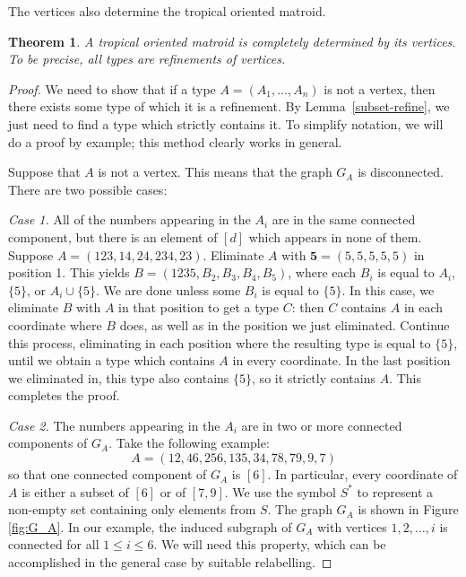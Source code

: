 \documentclass[11pt]{amsart}
\newtheorem{thm}{Theorem}[section]
\begin{document}
The vertices also determine the tropical oriented matroid.



\begin{thm}\label{thm:vertices}
A tropical oriented matroid is completely determined by its vertices. To be precise, all types are refinements of vertices.
\end{thm}

\begin{proof}
We need to show that if a type $A = (A_1, \ldots, A_n)$ is not a vertex, then there exists some type of which it is a 
refinement. By Lemma~\ref{subset-refine}, we just need to find a type which strictly contains it. To simplify notation, 
we will do a proof by example; this method clearly works in general.

Suppose that $A$ is not a vertex. This means that the graph $G_A$ is disconnected. There are two possible cases:

\textit{Case 1.} All of the numbers appearing in the $A_i$ are in the same connected component, but there is an element 
of $[d]$ which appears in none of them. Suppose $A = (123, 14, 24, 234, 23)$. Eliminate $A$ with $\textbf{5}=(5,5,5,5,5)$ in position 
1. This yields $B = (1235, B_2, B_3, B_4, B_5)$, where each $B_i$ is equal to $A_i$, $\{5\}$, or $A_i\cup \{5\}$. We are 
done unless some $B_i$ is equal to $\{5\}$. In this case, we eliminate $B$ with $A$ in that position to get a type $C$: 
then $C$ contains $A$ in each coordinate where $B$ does, as well as in the position we just eliminated. Continue 
this process, eliminating in each position where the resulting type is equal to $\{5\}$, until we obtain a type which 
contains $A$ in every coordinate. In the last position we eliminated in, this type also contains $\{5\}$, so 
it 
strictly contains $A$. This completes the proof.


\textit{Case 2.} The numbers appearing in the $A_i$ are in two or more connected components of $G_A$. Take the following 
example:
\[
A = (12,46,256,135,34,78,79,9,7)
\]
so that one connected component of $G_A$ is $[6]$. %
In particular, every coordinate of $A$ is either a subset of $[6]$ or of $[7, 9]$. 
We use the symbol $S^*$ to represent a non-empty set containing only elements from $S$.  The graph $G_A$ is shown in Figure \ref{fig:G_A}. In our example, the induced subgraph of $G_A$ with vertices $1,2,\ldots, i$ is connected for all $1 \leq i \leq 6$. We will need this property, which can be accomplished in the general case by suitable relabelling.


\end{proof}
\end{document}
